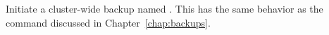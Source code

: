 Initiate a cluster-wide backup named .  This has the same behavior
as the  command discussed in Chapter~\ref{chap:backups}.

